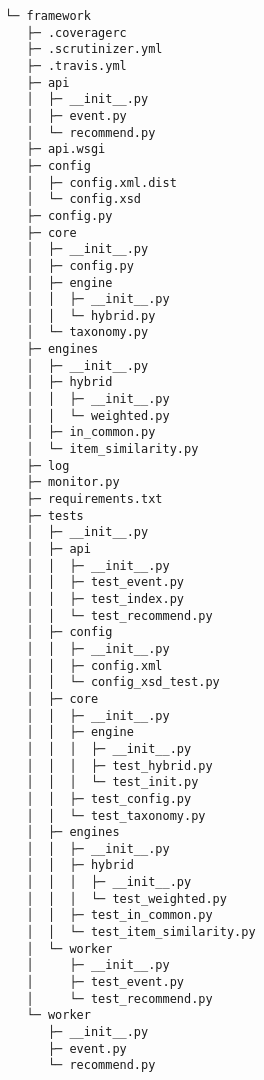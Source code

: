 \begin{codebox}
\begin{verbatim}
└─ framework
   ├─ .coveragerc
   ├─ .scrutinizer.yml
   ├─ .travis.yml
   ├─ api
   │  ├─ __init__.py
   │  ├─ event.py
   │  └─ recommend.py
   ├─ api.wsgi
   ├─ config
   │  ├─ config.xml.dist
   │  └─ config.xsd
   ├─ config.py
   ├─ core
   │  ├─ __init__.py
   │  ├─ config.py
   │  ├─ engine
   │  │  ├─ __init__.py
   │  │  └─ hybrid.py
   │  └─ taxonomy.py
   ├─ engines
   │  ├─ __init__.py
   │  ├─ hybrid
   │  │  ├─ __init__.py
   │  │  └─ weighted.py
   │  ├─ in_common.py
   │  └─ item_similarity.py
   ├─ log
   ├─ monitor.py
   ├─ requirements.txt
   ├─ tests
   │  ├─ __init__.py
   │  ├─ api
   │  │  ├─ __init__.py
   │  │  ├─ test_event.py
   │  │  ├─ test_index.py
   │  │  └─ test_recommend.py
   │  ├─ config
   │  │  ├─ __init__.py
   │  │  ├─ config.xml
   │  │  └─ config_xsd_test.py
   │  ├─ core
   │  │  ├─ __init__.py
   │  │  ├─ engine
   │  │  │  ├─ __init__.py
   │  │  │  ├─ test_hybrid.py
   │  │  │  └─ test_init.py
   │  │  ├─ test_config.py
   │  │  └─ test_taxonomy.py
   │  ├─ engines
   │  │  ├─ __init__.py
   │  │  ├─ hybrid
   │  │  │  ├─ __init__.py
   │  │  │  └─ test_weighted.py
   │  │  ├─ test_in_common.py
   │  │  └─ test_item_similarity.py
   │  └─ worker
   │     ├─ __init__.py
   │     ├─ test_event.py
   │     └─ test_recommend.py
   └─ worker
      ├─ __init__.py
      ├─ event.py
      └─ recommend.py

\end{verbatim}
\end{codebox}

